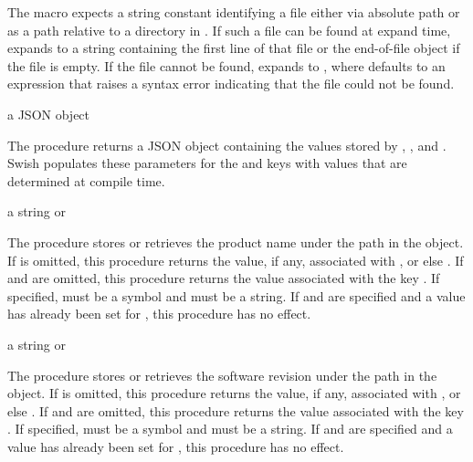 The  macro expects a string constant 
identifying a file either via absolute path or as a path relative to a
directory in .
If such a file can be found at expand time,  expands to a
string containing the first line of that file or the end-of-file object if the
file is empty.
If the file cannot be found,  expands to
, where  defaults to an
expression that raises a syntax error indicating that the file could not be
found.

\begin{procedure}
\end{procedure}
\hasvalue{} a JSON object

The  procedure returns a JSON object containing the values
stored by
,
, and
.
Swish populates these parameters for the
 and  keys
with values that are determined at compile time.

\begin{parameter}
\end{parameter}
\hasvalue{} a string or 

The  procedure stores or retrieves the product
name under the path  in the
 object.
If  is omitted, this procedure returns the value, if any,
associated with , or else .
If  and  are omitted, this procedure returns the value
associated with the key .
If specified,  must be a symbol and  must be a string.
If  and  are specified and a value has already been
set for , this procedure has no effect.

\begin{parameter}
\end{parameter}
\hasvalue{} a string or 

The  procedure stores or retrieves the software
revision under the path  in the
 object.
If  is omitted, this procedure returns the value, if any,
associated with , or else .
If  and  are omitted, this procedure returns the value
associated with the key .
If specified,  must be a symbol and  must be a string.
If  and  are specified and a value has already been
set for , this procedure has no effect.

